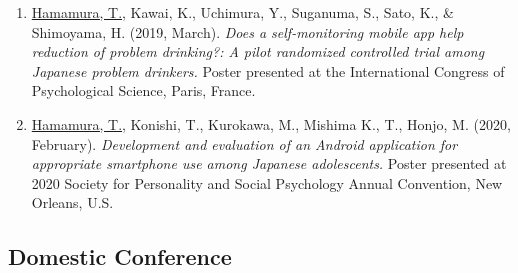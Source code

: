 \documentclass{article}
\begin{document}
\begin{enumerate}
	\item \underline{Hamamura, T.}, Kawai, K., Uchimura, Y., Suganuma, S., Sato, K., \& Shimoyama, H. (2019, March). \textit{Does a self-monitoring mobile app help reduction of problem drinking?: A pilot randomized controlled trial among Japanese problem drinkers.} Poster presented at the International Congress of Psychological Science, Paris, France.
	\item \underline{Hamamura, T.}, Konishi, T., Kurokawa, M., Mishima K., T., Honjo, M. (2020, February). \textit{Development and evaluation of an Android application for appropriate smartphone use among Japanese adolescents.} Poster presented at 2020 Society for Personality and Social Psychology Annual Convention, New Orleans, U.S.
\end{enumerate}

\subsection{Domestic Conference}
\end{document}
